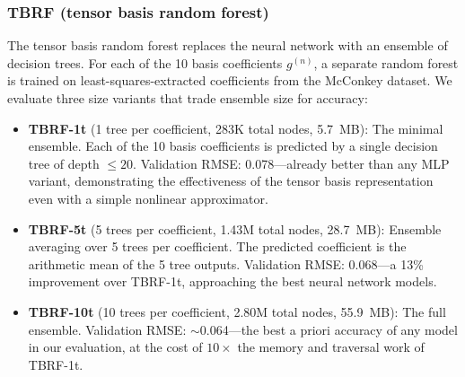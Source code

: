 \subsubsection{TBRF (tensor basis random forest)}
\label{sec:tbrf}

The tensor basis random forest \citep{Kaandorp2020} replaces the neural network with an ensemble of decision trees.
For each of the 10 basis coefficients $g^{(n)}$, a separate random forest is trained on least-squares-extracted coefficients from the McConkey dataset.
We evaluate three size variants that trade ensemble size for accuracy:

\begin{itemize}
    \item \textbf{TBRF-1t} (1 tree per coefficient, 283K total nodes, \SI{5.7}{MB}): The minimal ensemble. Each of the 10 basis coefficients is predicted by a single decision tree of depth $\leq 20$. Validation RMSE: 0.078---already better than any MLP variant, demonstrating the effectiveness of the tensor basis representation even with a simple nonlinear approximator.
    \item \textbf{TBRF-5t} (5 trees per coefficient, 1.43M total nodes, \SI{28.7}{MB}): Ensemble averaging over 5 trees per coefficient. The predicted coefficient is the arithmetic mean of the 5 tree outputs. Validation RMSE: 0.068---a 13\% improvement over TBRF-1t, approaching the best neural network models.
    \item \textbf{TBRF-10t} (10 trees per coefficient, 2.80M total nodes, \SI{55.9}{MB}): The full ensemble. Validation RMSE: $\sim$0.064---the best a priori accuracy of any model in our evaluation, at the cost of $10\times$ the memory and traversal work of TBRF-1t.
\end{itemize}

